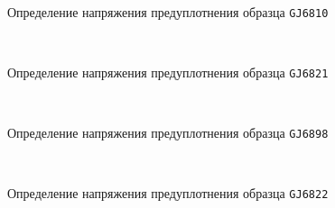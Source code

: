     \begin{figure}
        {\centering
        \small
            \hfill 
            \\
            \hfill  
            \hfill 
            }
            \caption{Определение напряжения предуплотнения образца \texttt{GJ6810}}
            \label{img:6810}
    \end{figure}
    
    \begin{figure}
        {\centering
        \small
            \hfill 
            \\
            \hfill  
            \hfill 
            }
            \caption{Определение напряжения предуплотнения образца \texttt{GJ6821}}
            \label{img:6821}
    \end{figure}
    
    \begin{figure}
        {\centering
        \small
            \hfill 
            \\
            \hfill  
            \hfill 
            }
            \caption{Определение напряжения предуплотнения образца \texttt{GJ6898}}
            \label{img:6898}
    \end{figure}
    
    \begin{figure}
        {\centering
        \small
            \hfill 
            \\
            \hfill  
            \hfill 
            }
            \caption{Определение напряжения предуплотнения образца \texttt{GJ6822}}
            \label{img:6822}
    \end{figure}
    
